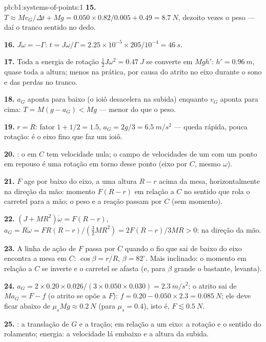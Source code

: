 \begin{solution}{pb:b1:systems-of-points:1}
\textbf{15.} $T \approx Mv_G/\Delta t + Mg = 0.050 \times 0.82/0.005 + 0.49 =
\qty{8.7}{N}$, dezoito vezes o peso --- daí o tranco sentido no
dedo.

\textbf{16.} $J\dot\omega = -\Gamma$: $t = J\omega/\Gamma = 2.25\times10^{-5} \times
205/10^{-4} = \qty{46}{s}$.

\textbf{17.} Toda a energia de rotação $\tfrac12 J\omega^2 = \qty{0.47}{J}$ se
converte em $Mgh'$: $h' = \qty{0.96}{m}$, quase toda a altura; menos na
prática, por causa do atrito no eixo durante o sono e das perdas no
tranco.

\textbf{18.} $a_G$ aponta para baixo (o ioiô desacelera na subida) enquanto
$v_G$ aponta para cima: $T = M(g - a_G) < Mg$ --- menor do que o peso.

\textbf{19.} $r = R$: fator $1 + 1/2 = 1.5$, $a_G = 2g/3 = \qty{6.5}{m/s^2}$
--- queda rápida, pouca rotação: é o eixo fino que faz um ioiô.

\textbf{20.} : o  em $C$ tem
velocidade nula; o campo de velocidades de um  com um ponto em
repouso é uma rotação em torno desse ponto (eixo por $C$, mesmo $\omega$).

\textbf{21.} $F$ age por baixo do eixo, a uma altura $R - r$ acima da
mesa, horizontalmente na direção da mão: momento $F(R - r)$ em relação a $C$
no sentido que rola o carretel para a mão; o peso e a reação passam por $C$
(sem momento).

\textbf{22.} $(J + MR^2)\dot\omega = F(R - r)$, $a_G = R\dot\omega = FR(R - r)/
(\tfrac32 MR^2) = 2F(R - r)/3MR > 0$: na direção da mão.

\textbf{23.} A linha de ação de $F$ passa por $C$ quando o fio que sai de
baixo do eixo encontra a mesa em $C$: $\cos\beta = r/R$,
$\beta = 82^\circ$. Mais inclinado: o momento em relação a $C$ se inverte e o carretel
se afasta (e, para $\beta$ grande o bastante, levanta).

\textbf{24.} $a_G = 2 \times 0.20 \times 0.026/(3 \times 0.050 \times 0.030) =
\qty{2.3}{m/s^2}$; o atrito sai de $Ma_G = F - f$ (o atrito se opõe a $F$):
$f = 0.20 - 0.050 \times 2.3 = \qty{0.085}{N}$; ele deve ficar abaixo de $\mu_sMg
\approx \qty{0.2}{N}$ (para $\mu_s = 0.4$), isto é, $F \lesssim \qty{0.5}{N}$.

\textbf{25.} : a translação de $G$ e a tração;  em relação a um eixo: a rotação e o sentido do rolamento;
energia: a velocidade lá embaixo e a altura da subida.
\end{solution}
